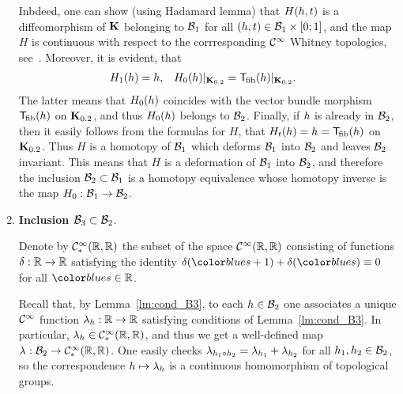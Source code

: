 \begin{enumerate}[wide, label={\rm\arabic*)}, topsep=1ex, itemsep=1ex]
Inbdeed, one can show (using Hadamard lemma) that $H(h,t)$ is a diffeomorphism of $\mathbf{K}$ belonging to $\mathcal{B}_{ 1 }$ for all $(h,t)\in\mathcal{B}_{ 1 }\times[0;1]$, and the map $H$ is continuous with respect to the corrresponding $\mathcal{C}^{\infty}$ Whitney topologies, see~\cite[Theorem~3.1.2]{KhokhliukMaksymenko:lens:2022}.
Moreover, it is evident, that 
\begin{align*}
    &H_1(h) = h, &
    &H_0(h)|_{\mathbf{K}_{0.2}} = \mathsf{T}_{\!\mathrm{fib}}(h)|_{\mathbf{K}_{0.2}}.
\end{align*}
The latter means that $H_0(h)$ coincides with the vector bundle morphism $\mathsf{T}_{\!\mathrm{fib}}(h)$ on $\mathbf{K}_{0.2}$, and thus $H_0(h)$ belongs to $\mathcal{B}_{ 2 }$.
Finally, if $h$ is already in $\mathcal{B}_{ 2 }$, then it easily follows from the formulas for $H$, that $H_t(h) = h = \mathsf{T}_{\!\mathrm{fib}}(h)$ on $\mathbf{K}_{0.2}$.
Thus $H$ is a homotopy of $\mathcal{B}_{ 1 }$ which deforms $\mathcal{B}_{ 1 }$ into $\mathcal{B}_{ 2 }$ and leaves $\mathcal{B}_{ 2 }$ invariant.
This means that $H$ is a deformation of $\mathcal{B}_{ 1 }$ into $\mathcal{B}_{ 2 }$, and therefore the inclusion $\mathcal{B}_{ 2 } \subset \mathcal{B}_{ 1 }$ is a homotopy equivalence whose homotopy inverse is the map $H_0:\mathcal{B}_{ 1 }\to\mathcal{B}_{ 2 }$.

\item
{\bf Inclusion $\mathcal{B}_{ 3 }\subset\mathcal{B}_{ 2 }$}.


Denote by $\mathcal{C}^{\infty}_{*}(\mathbb{R},\mathbb{R})$ the subset of the space $\mathcal{C}^{\infty}(\mathbb{R},\mathbb{R})$ consisting of functions $\delta:\mathbb{R}\to\mathbb{R}$ satisfying the identity $\delta(\as+1)+\delta(\as)\equiv 0$ for all $\as\in\bR$.

Recall that, by Lemma~\ref{lm:cond_B3}, to each $h\in\mathcal{B}_{ 2 }$ one associates a unique $\mathcal{C}^{\infty}$ function $\lambda_{h}:\mathbb{R}\to\mathbb{R}$ satisfying conditions of Lemma~\ref{lm:cond_B3}.
In particular, $\lambda_{h}\in\mathcal{C}^{\infty}_{*}(\mathbb{R},\mathbb{R})$, and thus we get a well-defined map $\lambda_{}:\mathcal{B}_{ 2 }\to\mathcal{C}^{\infty}_{*}(\mathbb{R},\mathbb{R})$.
One easily checks $\lambda_{h_1 \circ h_2} = \lambda_{h_1} + \lambda_{h_2}$ for all $h_1,h_2\in\mathcal{B}_{ 2 }$, so the correspondence $h\mapsto\lambda_{h}$ is a continuous homomorphism of topological groups.


\end{enumerate}
